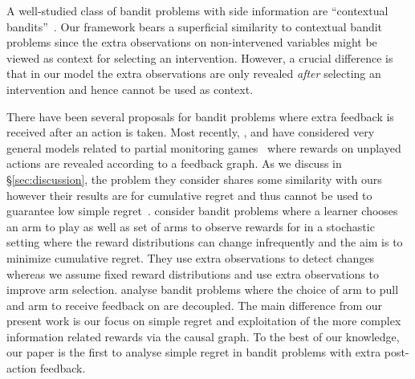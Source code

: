 A well-studied class of bandit problems with side information are ``contextual bandits''~\cite{Langford2008,Agarwal2014}. Our framework bears a superficial similarity to contextual bandit problems since the extra observations on non-intervened variables might be viewed as context for selecting an intervention. 
However, a crucial difference is that in our model the extra observations are only revealed \emph{after} selecting an intervention and hence cannot be used as context. %

There have been several proposals for bandit problems where extra feedback is received after an action is taken.
Most recently, \citet{Alon2015}, \citet{Kocak2014} and \citet{wu2015online} have considered very general models related to partial monitoring games~\citep{Bartok2014} where rewards on unplayed actions are revealed according to a feedback graph. As we discuss in \S\ref{sec:discussion}, the problem they consider shares some similarity with ours however their results are for cumulative regret and thus cannot be used to guarantee low simple regret~\citep{Bubeck2009a}.
\citet{Yu2009} consider bandit problems where a learner chooses an arm to play as well as set of arms to observe rewards for in a stochastic setting where the reward distributions can change infrequently and the aim is to minimize cumulative regret.
They use extra observations to detect changes whereas we assume fixed reward distributions and use extra observations to improve arm selection.
\citet{Avner2012} analyse bandit problems where the choice of arm to pull and arm to receive feedback on are decoupled. 
The main difference from our present work is our focus on simple regret and exploitation of the more complex information related rewards via the causal graph.
To the best of our knowledge, our paper is the first to analyse simple regret in bandit problems with extra post-action feedback.



